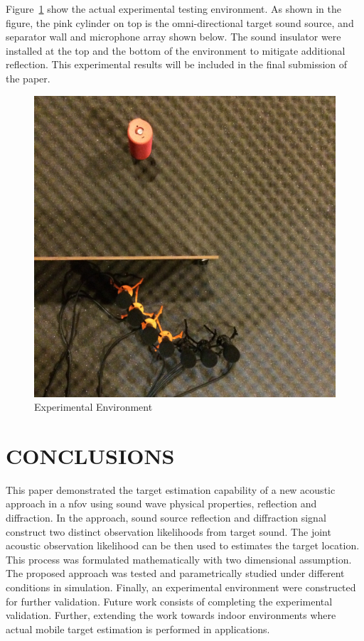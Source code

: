 \documentclass[letterpaper, 10 pt, conference]{ieeeconf}  %
\begin{document}
Figure~\ref{fig:exp} show the actual experimental testing environment. As shown in the figure, the pink cylinder on top is the omni-directional target sound source, and separator wall and microphone array shown below. The sound insulator were installed at the top and the bottom of the environment to mitigate additional reflection. This experimental results will be included in the final submission of the paper. 
\begin{figure}[thpb]
	\centering
	\includegraphics[width=0.7\columnwidth]{Figures/experiment.jpg} %
	\caption{Experimental Environment}
	\label{fig:exp}
\end{figure}

\section{CONCLUSIONS}
This paper demonstrated the target estimation capability of a new acoustic approach in a \gls{nfov} using sound wave physical properties, reflection and diffraction. In the approach, sound source reflection and diffraction signal construct two distinct observation likelihoods from target sound. The joint acoustic observation likelihood can be then used to estimates the target location. This process was formulated mathematically with two dimensional assumption. The proposed approach was tested and parametrically studied under different conditions in simulation. Finally, an experimental environment were constructed for further validation.
Future work consists of completing the experimental validation. Further, extending the work towards indoor environments where actual mobile target estimation is performed in applications.
                                  
\end{document}
